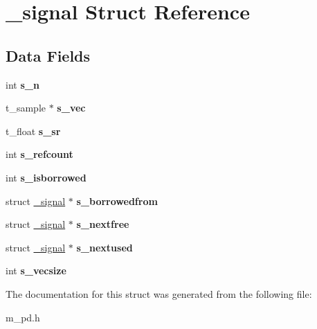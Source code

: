 \hypertarget{struct__signal}{}\section{\+\_\+signal Struct Reference}
\label{struct__signal}
\subsection*{Data Fields}
\begin{DoxyCompactItemize}
\item 
\mbox{\label{struct__signal_aee0a45e5329caef59b617145b09fc3fa}} 
int {\bfseries s\+\_\+n}
\item 
\mbox{\label{struct__signal_ad4ecec8b90444188a47a8cde0babc5ae}} 
t\+\_\+sample $\ast$ {\bfseries s\+\_\+vec}
\item 
\mbox{\label{struct__signal_a8ba1138e0b981e66f0f8bf5d43acc167}} 
t\+\_\+float {\bfseries s\+\_\+sr}
\item 
\mbox{\label{struct__signal_a42a0b1e2d910862e122c6f7d405487f5}} 
int {\bfseries s\+\_\+refcount}
\item 
\mbox{\label{struct__signal_a211530a9874e7c762db5ed3331af114d}} 
int {\bfseries s\+\_\+isborrowed}
\item 
\mbox{\label{struct__signal_af3c568b7265404de9c4fc354806b885e}} 
struct \hyperlink{struct__signal}{\+\_\+signal} $\ast$ {\bfseries s\+\_\+borrowedfrom}
\item 
\mbox{\label{struct__signal_a1563a6d75e23f0d92b8842c5523a069e}} 
struct \hyperlink{struct__signal}{\+\_\+signal} $\ast$ {\bfseries s\+\_\+nextfree}
\item 
\mbox{\label{struct__signal_a80b00e740f17b23928cba11f8f0a7c6a}} 
struct \hyperlink{struct__signal}{\+\_\+signal} $\ast$ {\bfseries s\+\_\+nextused}
\item 
\mbox{\label{struct__signal_a769a509c26775c6ff747d1a1f3326456}} 
int {\bfseries s\+\_\+vecsize}
\end{DoxyCompactItemize}


The documentation for this struct was generated from the following file\+:\begin{DoxyCompactItemize}
\item 
m\+\_\+pd.\+h\end{DoxyCompactItemize}
